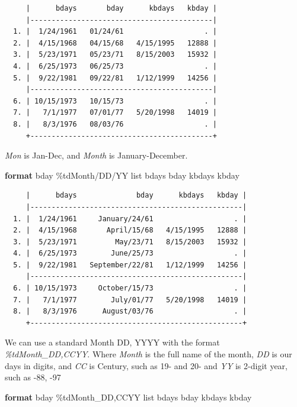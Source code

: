 \documentclass[
]{book}
\newenvironment{Shaded}{\begin{snugshade}}{\end{snugshade}}
\newcommand{\KeywordTok}[1]{\textcolor[rgb]{0.13,0.29,0.53}{\textbf{#1}}}
\newcommand{\NormalTok}[1]{#1}
\newcommand{\OtherTok}[1]{\textcolor[rgb]{0.56,0.35,0.01}{#1}}
\begin{document}
\begin{verbatim}
     |      bdays       bday      kbdays   kbday |
     |-------------------------------------------|
  1. |  1/24/1961   01/24/61                   . |
  2. |  4/15/1968   04/15/68   4/15/1995   12888 |
  3. |  5/23/1971   05/23/71   8/15/2003   15932 |
  4. |  6/25/1973   06/25/73                   . |
  5. |  9/22/1981   09/22/81   1/12/1999   14256 |
     |-------------------------------------------|
  6. | 10/15/1973   10/15/73                   . |
  7. |   7/1/1977   07/01/77   5/20/1998   14019 |
  8. |   8/3/1976   08/03/76                   . |
     +-------------------------------------------+
\end{verbatim}

\emph{Mon} is Jan-Dec, and \emph{Month} is January-December.

\begin{Shaded}
\begin{Highlighting}[]
\KeywordTok{format}\NormalTok{ bday \%tdMonth/DD/YY }
\OtherTok{list}\NormalTok{ bdays bday kbdays kbday}
\end{Highlighting}
\end{Shaded}

\begin{verbatim}
     |      bdays              bday      kbdays   kbday |
     |--------------------------------------------------|
  1. |  1/24/1961     January/24/61                   . |
  2. |  4/15/1968       April/15/68   4/15/1995   12888 |
  3. |  5/23/1971         May/23/71   8/15/2003   15932 |
  4. |  6/25/1973        June/25/73                   . |
  5. |  9/22/1981   September/22/81   1/12/1999   14256 |
     |--------------------------------------------------|
  6. | 10/15/1973     October/15/73                   . |
  7. |   7/1/1977        July/01/77   5/20/1998   14019 |
  8. |   8/3/1976      August/03/76                   . |
     +--------------------------------------------------+
\end{verbatim}

We can use a standard Month DD, YYYY with the format \emph{\%tdMonth\_DD,CCYY}. Where \emph{Month} is the full name of the month, \emph{DD} is our days in digits, and \emph{CC} is Century, such as 19- and 20- and \emph{YY} is 2-digit year, such as -88, -97

\begin{Shaded}
\begin{Highlighting}[]
\KeywordTok{format}\NormalTok{ bday \%tdMonth\_DD,CCYY}
\OtherTok{list}\NormalTok{ bdays bday kbdays kbday}
\end{Highlighting}
\end{Shaded}
\end{document}
